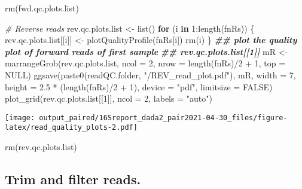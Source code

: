 \documentclass[
]{article}
\newenvironment{Shaded}{\begin{snugshade}}{\end{snugshade}}
\newcommand{\AttributeTok}[1]{\textcolor[rgb]{0.77,0.63,0.00}{#1}}
\newcommand{\CommentTok}[1]{\textcolor[rgb]{0.56,0.35,0.01}{\textit{#1}}}
\newcommand{\ConstantTok}[1]{\textcolor[rgb]{0.00,0.00,0.00}{#1}}
\newcommand{\ControlFlowTok}[1]{\textcolor[rgb]{0.13,0.29,0.53}{\textbf{#1}}}
\newcommand{\DecValTok}[1]{\textcolor[rgb]{0.00,0.00,0.81}{#1}}
\newcommand{\DocumentationTok}[1]{\textcolor[rgb]{0.56,0.35,0.01}{\textbf{\textit{#1}}}}
\newcommand{\FloatTok}[1]{\textcolor[rgb]{0.00,0.00,0.81}{#1}}
\newcommand{\FunctionTok}[1]{\textcolor[rgb]{0.00,0.00,0.00}{#1}}
\newcommand{\NormalTok}[1]{#1}
\newcommand{\OtherTok}[1]{\textcolor[rgb]{0.56,0.35,0.01}{#1}}
\newcommand{\SpecialCharTok}[1]{\textcolor[rgb]{0.00,0.00,0.00}{#1}}
\newcommand{\StringTok}[1]{\textcolor[rgb]{0.31,0.60,0.02}{#1}}
\begin{document}
\begin{Shaded}
\begin{Highlighting}[]
\FunctionTok{rm}\NormalTok{(fwd.qc.plots.list)}


\CommentTok{\# Reverse reads}
\NormalTok{rev.qc.plots.list }\OtherTok{\textless{}{-}} \FunctionTok{list}\NormalTok{()}
\ControlFlowTok{for}\NormalTok{ (i }\ControlFlowTok{in} \DecValTok{1}\SpecialCharTok{:}\FunctionTok{length}\NormalTok{(fnRs)) \{}
\NormalTok{    rev.qc.plots.list[[i]] }\OtherTok{\textless{}{-}} \FunctionTok{plotQualityProfile}\NormalTok{(fnRs[i])}
    \FunctionTok{rm}\NormalTok{(i)}
\NormalTok{\}}
\DocumentationTok{\#\# plot the quality plot of forward reads of first sample}
\DocumentationTok{\#\# rev.qc.plots.list[[1]]}
\NormalTok{mR }\OtherTok{\textless{}{-}} \FunctionTok{marrangeGrob}\NormalTok{(rev.qc.plots.list, }\AttributeTok{ncol =} \DecValTok{2}\NormalTok{, }\AttributeTok{nrow =} \FunctionTok{length}\NormalTok{(fnRs)}\SpecialCharTok{/}\DecValTok{2} \SpecialCharTok{+} 
    \DecValTok{1}\NormalTok{, }\AttributeTok{top =} \ConstantTok{NULL}\NormalTok{)}
\FunctionTok{ggsave}\NormalTok{(}\FunctionTok{paste0}\NormalTok{(readQC.folder, }\StringTok{"/REV\_read\_plot.pdf"}\NormalTok{), mR, }\AttributeTok{width =} \DecValTok{7}\NormalTok{, }
    \AttributeTok{height =} \FloatTok{2.5} \SpecialCharTok{*}\NormalTok{ (}\FunctionTok{length}\NormalTok{(fnRs)}\SpecialCharTok{/}\DecValTok{2} \SpecialCharTok{+} \DecValTok{1}\NormalTok{), }\AttributeTok{device =} \StringTok{"pdf"}\NormalTok{, }\AttributeTok{limitsize =} \ConstantTok{FALSE}\NormalTok{)}
\FunctionTok{plot\_grid}\NormalTok{(rev.qc.plots.list[[}\DecValTok{1}\NormalTok{]], }\AttributeTok{ncol =} \DecValTok{2}\NormalTok{, }\AttributeTok{labels =} \StringTok{"auto"}\NormalTok{)}
\end{Highlighting}
\end{Shaded}

\texttt{[image: output\_paired/16Sreport\_dada2\_pair2021-04-30\_files/figure-latex/read\_quality\_plots-2.pdf]}

\begin{Shaded}
\begin{Highlighting}[]
\FunctionTok{rm}\NormalTok{(rev.qc.plots.list)}
\end{Highlighting}
\end{Shaded}

\hypertarget{trim-and-filter-reads.}{%
\subsection{Trim and filter reads.}\label{trim-and-filter-reads.}}
\end{document}
